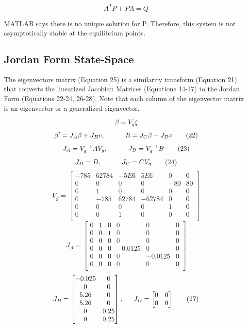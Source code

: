 \documentclass[conference]{IEEEtran}
\begin{document}
\[
A^TP + PA = Q \tag{20}
\]

MATLAB says there is no unique solution for P. Therefore, this system is not asymptotically stable at the equilibrium points. 

\subsection{Jordan Form State-Space}
The eigenvectors matrix (Equation 25) is a similarity transform (Equation 21) that converts the linearized Jacobian Matrices (Equations 14-17) to the Jordan Form (Equations 22-24, 26-28). Note that each column of the eigenvector matrix is an eigenvector or a generalized eigenvector. 

\[\beta = V_g\zeta
\tag{21} 
\]
\[
\beta^{\prime} = J_{A}\beta + J_{B}v, \indent \indent  R = J_{C}\beta + J_{D}v
\tag{22}
\] 
\[
J_A = V_g^{-1}AV_g, \indent \indent  J_B = V_g^{-1}B  \tag{23}
\]
\[
J_D = D,\indent \indent J_C = CV_g\tag{24}
\]
\[
V_g = 
\begin{bmatrix}
-785&62784&-5E6& 5E6& 0 &0\\
0 &0 &0 &0 &-80 &80\\
0 &1 &0 &0 &0 &0\\
0 &-785 &62784&-62784 &0 &0\\
0 &0 &0 &0 &1 &0\\
0 &0 &1 &0 &0 &0\\
\end{bmatrix}
\tag{25}
\]
\[
J_A = 
\begin{bmatrix}
0 &1 &0 &0 &0 &0\\
0 &0 &1 &0 &0 &0\\
0 &0 &0 &0 &0 &0\\
0 &0 &0 &-0.0125 &0 &0\\
0 &0 &0 &0 &-0.0125 &0\\
0 &0 &0 &0 &0 &0\\
\end{bmatrix}
\tag{26}
\]
\[
J_B = 
\begin{bmatrix}
-0.025 &0\\
0 &0\\
5.26 &0\\
5.26& 0\\
 0&0.25\\
0& 0.25\\
\end{bmatrix},
\indent J_D =
\begin{bmatrix}
0&0\\
0&0\\
\end{bmatrix}
\tag{27}
\] 
\end{document}
